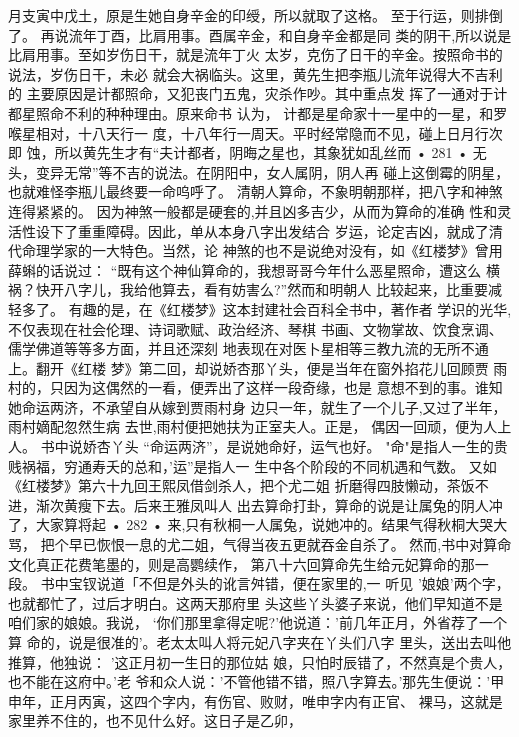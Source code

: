 月支寅中戊土，原是生她自身辛金的印绶，所以就取了这格。
至于行运，则排倒了。
再说流年丁酉，比肩用事。酉属辛金，和自身辛金都是同
类的阴干,所以说是比肩用事。至如岁伤日干，就是流年丁火
太岁，克伤了日干的辛金。按照命书的说法，岁伤日干，未必
就会大祸临头。这里，黄先生把李瓶儿流年说得大不吉利的
主要原因是计都照命，又犯丧门五鬼，灾杀作吵。其中重点发
挥了一通对于计都星照命不利的种种理由。原来命书 认为，
计都是星命家十一星中的一星，和罗喉星相对，十八天行一
度，十八年行一周天。平时经常隐而不见，碰上日月行次即
蚀，所以黄先生才有“夫计都者，阴晦之星也，其象犹如乱丝而
• 281 •
无头，变异无常”等不吉的说法。在阴阳中，女人属阴，阴人再
碰上这倒霉的阴星，也就难怪李瓶儿最终要一命呜呼了。
清朝人算命，不象明朝那样，把八字和神煞连得紧紧的。
因为神煞一般都是硬套的,并且凶多吉少，从而为算命的准确
性和灵活性设下了重重障碍。因此，单从本身八字出发结合
岁运，论定吉凶，就成了清代命理学家的一大特色。当然，论
神煞的也不是说绝对没有，如《红楼梦》曾用薛蝌的话说过：
“既有这个神仙算命的，我想哥哥今年什么恶星照命，遭这么
横祸？快开八字儿，我给他算去，看有妨害么?”然而和明朝人
比较起来，比重要减轻多了。
有趣的是，在《红楼梦》这本封建社会百科全书中，著作者
学识的光华,不仅表现在社会伦理、诗词歌赋、政治经济、琴棋
书画、文物掌故、饮食烹调、儒学佛道等等多方面，并且还深刻
地表现在对医卜星相等三教九流的无所不通上。翻开《红楼
梦》第二回，却说娇杏那丫头，便是当年在窗外掐花儿回顾贾
雨村的，只因为这偶然的一看，便弄出了这样一段奇缘，也是
意想不到的事。谁知她命运两济，不承望自从嫁到贾雨村身
边只一年，就生了一个儿子,又过了半年，雨村嫡配忽然生病
去世,雨村便把她扶为正室夫人。正是，
偶因一回顽，便为人上人。
书中说娇杏丫头 “命运两济”，是说她命好，运气也好。
"命"是指人一生的贵贱祸福，穷通寿夭的总和，'运”是指人一
生中各个阶段的不同机遇和气数。
又如《红楼梦》第六十九回王熙凤借剑杀人，把个尤二姐
折磨得四肢懒动，茶饭不进，渐次黄瘦下去。后来王雅凤叫人
出去算命打卦，算命的说是让属兔的阴人冲了，大家算将起
• 282 •
来,只有秋桐一人属兔，说她冲的。结果气得秋桐大哭大骂，
把个早已恢恨一息的尤二姐，气得当夜五更就吞金自杀了。
然而,书中对算命文化真正花费笔墨的，则是高鹦续作，
第八十六回算命先生给元妃算命的那一段。
书中宝钗说道「不但是外头的讹言舛错，便在家里的,一
听见 '娘娘'两个字，也就都忙了，过后才明白。这两天那府里
头这些丫头婆子来说，他们早知道不是咱们家的娘娘。我说，
‘你们那里拿得定呢?'他说道：'前几年正月，外省荐了一个算
命的，说是很准的'。老太太叫人将元妃八字夹在丫头们八字
里头，送出去叫他推算，他独说： '这正月初一生日的那位姑
娘，只怕时辰错了，不然真是个贵人，也不能在这府中。'老
爷和众人说：’不管他错不错，照八字算去。'那先生便说：'甲
申年，正月丙寅，这四个字内，有伤官、败财，唯申字内有正官、
裸马，这就是家里养不住的，也不见什么好。这日子是乙卯，
